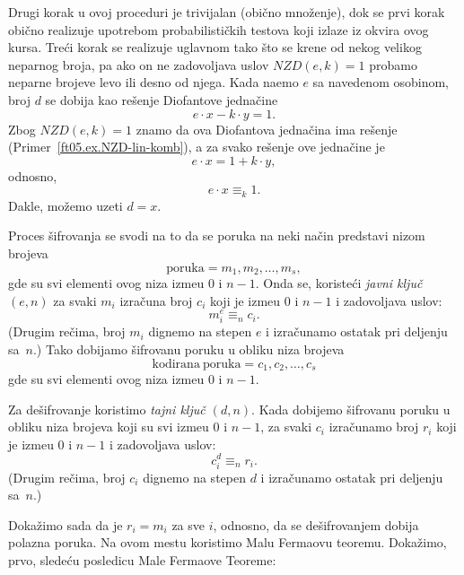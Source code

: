   Drugi korak u ovoj proceduri je trivijalan (obi\v cno mno\v zenje),
  dok se prvi korak obi\v cno realizuje upotrebom probabilisti\v ckih testova koji izlaze iz okvira ovog kursa.
  Tre\'ci korak se realizuje uglavnom tako \v sto se krene od nekog velikog neparnog broja, pa ako on ne zadovoljava uslov
  $\mathit{NZD}(e, k) = 1$ probamo neparne brojeve levo ili desno od njega. Kada na\dj emo $e$ sa navedenom osobinom,
  broj $d$ se dobija kao re\v senje Diofantove jedna\v cine
  $$
    e \cdot x - k \cdot y = 1.
  $$
  Zbog $\mathit{NZD}(e, k) = 1$ znamo da ova Diofantova jedna\v cina ima re\v senje (Primer~\ref{ft05.ex.NZD-lin-komb}),
  a za svako re\v senje ove jedna\v cine je
  $$
    e \cdot x = 1 + k \cdot y,
  $$
  odnosno,
  $$
    e \cdot x \equiv_k 1.
  $$
  Dakle, mo\v zemo uzeti $d = x$.
  
  \medskip
  
  Proces \v sifrovanja se svodi na to da se poruka na neki na\v cin predstavi nizom brojeva
  $$
    \mathrm{poruka} = m_1, m_2, \ldots, m_s,
  $$
  gde su svi elementi ovog niza izme\dj u $0$ i $n - 1$. Onda se, koriste\'ci \emph{javni klju\v c $(e, n)$}
  za svaki $m_i$ izra\v cuna broj $c_i$ koji je izme\dj u $0$ i $n - 1$ i zadovoljava uslov:
  $$
    m_i^e \equiv_n c_i.
  $$
  (Drugim re\v cima, broj $m_i$ dignemo na stepen $e$ i izra\v cunamo ostatak pri deljenju sa~$n$.)
  Tako dobijamo \v sifrovanu poruku u obliku niza brojeva
  $$
    \mathrm{kodirana\ poruka} = c_1, c_2, \ldots, c_s
  $$
  gde su svi elementi ovog niza izme\dj u $0$ i $n - 1$.
  
  Za de\v sifrovanje koristimo \emph{tajni klju\v c $(d, n)$}. Kada dobijemo \v sifrovanu poruku u obliku niza
  brojeva koji su svi izme\dj u $0$ i $n - 1$, za svaki $c_i$ izra\v cunamo broj $r_i$ koji je izme\dj u $0$ i $n - 1$
  i zadovoljava uslov:
  $$
    c_i^d \equiv_n r_i.
  $$
  (Drugim re\v cima, broj $c_i$ dignemo na stepen $d$ i izra\v cunamo ostatak pri deljenju sa~$n$.)
  
  Doka\v zimo sada da je $r_i = m_i$ za sve $i$, odnosno, da se de\v sifrovanjem dobija polazna poruka.
  Na ovom mestu koristimo Malu Fermaovu teoremu. Doka\v zimo, prvo, slede\'cu posledicu Male Fermaove Teoreme:
  

